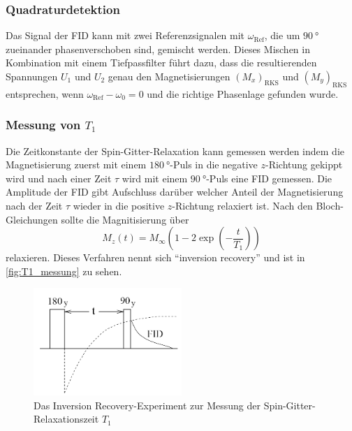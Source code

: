 \subsubsection{Quadraturdetektion}
\label{sssec:Quadraturdetektion}

Das Signal der FID kann mit zwei Referenzsignalen mit $\omega_\text{Ref}$,
die um $\SI{90}{\degree}$ zueinander phasenverschoben sind, gemischt werden.
Dieses Mischen in Kombination mit einem Tiefpassfilter führt dazu, 
dass die resultierenden Spannungen $U_1$ und $U_2$ genau den Magnetisierungen $(M_x)_\text{RKS}$ und $(M_y)_\text{RKS}$ entsprechen,
wenn $\omega_\text{Ref} - \omega_0 = 0$ und die richtige Phasenlage gefunden wurde.

\subsubsection{Messung von \texorpdfstring{$T_1$}{T1}}
\label{sssec:T1_Messung}

Die Zeitkonstante der Spin-Gitter-Relaxation kann gemessen werden 
indem die Magnetisierung zuerst mit einem $\SI{180}{\degree}$-Puls in die negative $z$-Richtung gekippt wird
und nach einer Zeit $\tau$ wird mit einem $\SI{90}{\degree}$-Puls eine FID gemessen.
Die Amplitude der FID gibt Aufschluss darüber welcher Anteil der Magnetisierung nach der Zeit $\tau$ wieder in die positive $z$-Richtung relaxiert ist.
Nach den Bloch-Gleichungen sollte die Magnitisierung über
\begin{equation}
    M_z(t) = M_\infty\left(1-2\exp\left(-\frac{t}{T_1}\right)\right)
\end{equation} 
relaxieren.
Dieses Verfahren nennt sich \enquote{inversion recovery} und ist in \autoref{fig:T1_messung} zu sehen.

\begin{figure}
    \centering
    \includegraphics[width=0.5\textwidth]{images/T1_messung.png}
    \caption{Das Inversion Recovery-Experiment zur Messung der Spin-Gitter-Relaxationszeit $T_1$}
    \label{fig:T1_messung}
\end{figure}

